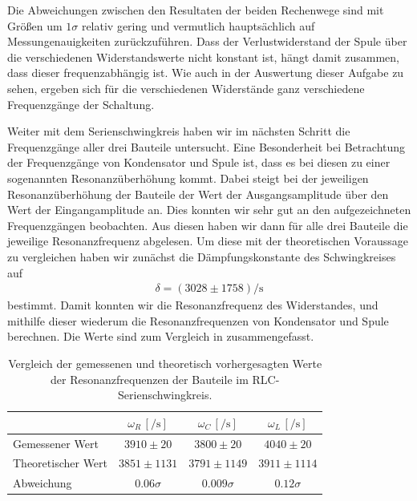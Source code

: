 Die Abweichungen zwischen den Resultaten der beiden Rechenwege sind mit Größen um $1\sigma$ relativ gering und vermutlich hauptsächlich auf Messungenauigkeiten zurückzuführen. Dass der Verlustwiderstand der Spule über die verschiedenen Widerstandswerte nicht konstant ist, hängt damit zusammen, dass dieser frequenzabhängig ist. Wie auch in der Auswertung dieser Aufgabe zu sehen, ergeben sich für die verschiedenen Widerstände ganz verschiedene Frequenzgänge der Schaltung.

Weiter mit dem Serienschwingkreis haben wir im nächsten Schritt die Frequenzgänge aller drei Bauteile untersucht. Eine Besonderheit bei Betrachtung der Frequenzgänge von Kondensator und Spule ist, dass es bei diesen zu einer sogenannten Resonanzüberhöhung kommt. Dabei steigt bei der jeweiligen Resonanzüberhöhung der Bauteile der Wert der Ausgangsamplitude über den Wert der Eingangamplitude an. Dies konnten wir sehr gut an den aufgezeichneten Frequenzgängen beobachten. Aus diesen haben wir dann für alle drei Bauteile die jeweilige Resonanzfrequenz abgelesen. Um diese mit der theoretischen Voraussage zu vergleichen haben wir zunächst die Dämpfungskonstante des Schwingkreises auf
\begin{align*}
  \delta = (3028 \pm 1758)\si{\per\second}
\end{align*}
bestimmt. Damit konnten wir die Resonanzfrequenz des Widerstandes, und mithilfe dieser wiederum die Resonanzfrequenzen von Kondensator und Spule berechnen. Die Werte sind zum Vergleich in  zusammengefasst.


\renewcommand{\arraystretch}{1.5}
\begin{table}[H]
  \centering
  \caption{Vergleich der gemessenen und theoretisch vorhergesagten Werte der Resonanzfrequenzen der Bauteile im RLC-Serienschwingkreis.}\vspace*{0.5em}
  \label{tab:zmf_omega_vergleich}
  \begin{tabular}{|l|c|c|c|}
    \hline
    & $\omega_R\,[\si{\per\second}]$ & $\omega_C\,[\si{\per\second}]$ & $\omega_L\,[\si{\per\second}]$\\\hline
    Gemessener Wert & $3910 \pm 20$ & $3800 \pm 20$ & $4040 \pm 20$ \\\hline
    Theoretischer Wert & $3851 \pm 1131$ & $3791 \pm 1149$ & $3911 \pm 1114$\\\hline\hline
    Abweichung & $0.06\sigma$ & $0.009\sigma$ & $0.12\sigma$\\
    \hline
  \end{tabular}
\end{table}
\renewcommand{\arraystretch}{1}

